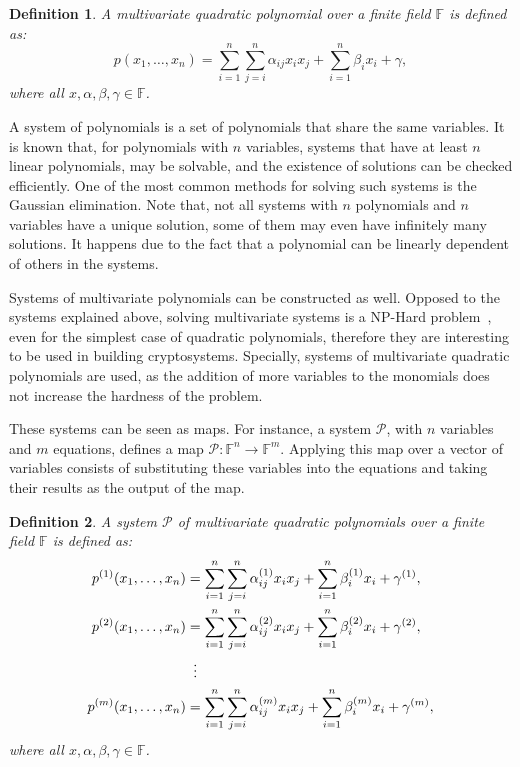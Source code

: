 \documentclass{ufsctex/ufsctex}
\newtheorem{definition}{Definition}
\begin{document}
\begin{definition}
A multivariate quadratic polynomial over a finite field $\mathbb{F}$ is defined
as:
\begin{equation}
p(x_1,\dots,x_n) = \sum_{i=1}^n \sum_{j=i}^n \alpha_{ij} x_i x_j +
	\sum_{i=1}^n \beta_i x_i + \gamma,
\end{equation}
where all $x, \alpha, \beta, \gamma \in \mathbb{F}$.
\end{definition}

A system of polynomials is a set of polynomials that share the same variables.
It is known that, for polynomials with $n$ variables, systems that have at
least $n$ linear polynomials, may be solvable, and the existence of solutions
can be checked efficiently. One of the most common methods for solving such
systems is the Gaussian elimination. Note that, not all systems with $n$
polynomials and $n$ variables have a unique solution, some of them may even
have infinitely many solutions. It happens due to the fact that a polynomial
can be linearly dependent of others in the systems.

Systems of multivariate polynomials can be constructed as well. Opposed to the
systems explained above, solving multivariate systems is a NP-Hard
problem~\cite{garey1979npc}, even for the simplest case of quadratic
polynomials, therefore they are interesting to be used in building
cryptosystems. Specially, systems of multivariate quadratic polynomials are
used, as the addition of more variables to the monomials does not increase the
hardness of the problem.

These systems can be seen as maps. For instance, a system $\mathcal{P}$, with
$n$ variables and $m$ equations, defines a map $\mathcal{P}:\mathbb{F}^n \to
\mathbb{F}^m$. Applying this map over a vector of variables consists of
substituting these variables into the equations and taking their results as the
output of the map.

\begin{definition}\label{def:mqsystem}
A system $\mathcal{P}$ of multivariate quadratic polynomials over a finite
field $\mathbb{F}$ is defined as:
\begin{equation}\label{eq:mqsystem}
\begin{split}
p^{(1)}(x_1,\dots,x_n) &= \sum_{i=1}^n \sum_{j=i}^n \alpha^{(1)}_{ij} x_i x_j
	+ \sum_{i=1}^n \beta^{(1)}_i x_i + \gamma^{(1)}, \\
p^{(2)}(x_1,\dots,x_n) &= \sum_{i=1}^n \sum_{j=i}^n \alpha^{(2)}_{ij} x_i x_j
	+ \sum_{i=1}^n \beta^{(2)}_i x_i + \gamma^{(2)}, \\
&\vdotswithin{=} \\
p^{(m)}(x_1,\dots,x_n) &= \sum_{i=1}^n \sum_{j=i}^n \alpha^{(m)}_{ij} x_i x_j
	+ \sum_{i=1}^n \beta^{(m)}_i x_i + \gamma^{(m)},
\end{split}
\end{equation}
where all $x, \alpha, \beta, \gamma \in \mathbb{F}$.
\end{definition}
\end{document}
